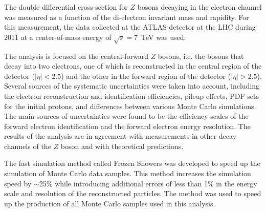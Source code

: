 \documentclass[oneside,11pt]{Classes/PhDthesisPSnPDF}
\begin{document}
\begin{abstracts}
The double differential cross-section for $Z$ bosons decaying in the electron channel was measured as a function of the di-electron invariant mass and rapidity. For this measurement, the data collected at the ATLAS detector at the LHC during 2011 at a center-of-mass energy of $\sqrt{s} = 7$~TeV was used.

The analysis is focused on the central-forward $Z$ bosons, i.e. the bosons that decay into two electrons, one of which is reconstructed in the central region of the detector ($|\eta| < 2.5$) and the other in the forward region of the detector ($|\eta| > 2.5$). Several sources of the systematic uncertainties were taken into account, including the electron reconstruction and identification efficiencies, pileup effects, PDF sets for the initial protons, and differences between various Monte Carlo simulations. The main sources of uncertainties were found to be the efficiency scales of the forward electron identification and the forward electron energy resolution. The results of the analysis are in agreement with measurements in other decay channels of the $Z$ boson and with theoretical predictions.

The fast simulation method called Frozen Showers was developed to speed up the simulation of Monte Carlo data samples. This method increases the simulation speed by $\sim$25\% while introducing additional errors of less than 1\% in the energy scale and resolution of the reconstructed particles. The method was used to speed up the production of all Monte Carlo samples used in this analysis.

\end{abstracts}

\cleardoublepage
\end{document}

